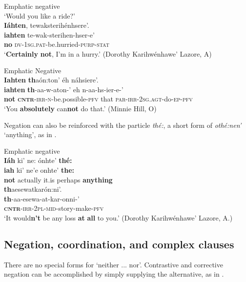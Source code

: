 \documentclass[output=paper,colorlinks,citecolor=brown]{langscibook}
\begin{document}
\ea\label{ex:moh:96}Emphatic negative\\ \medskip ‘Would you like a ride?’\\ \medskip
    \glll \textbf{Iáhten}, tewaksterihénhsere’. \\
         \textbf{iahten} te-wak-sterihen-hser-e’ \\
         \textbf{no} \textsc{dv-1sg.pat-}be.hurried-\textsc{purp-stat}\\
    \glt ‘\textbf{Certainly} \textbf{not}, I’m in a hurry.’ (Dorothy Karihwénhawe’ Lazore, A)
\z


\ea\label{ex:moh:97}Emphatic Negative\\
    \glll \textbf{Iahten} \textbf{th}aón:ton’ éh náhsiere’. \\
         \textbf{iahten} \textbf{th}-aa-w-aton-’ eh n-aa-hs-ier-e-’\\
         \textbf{not} \textsc{\textbf{cntr}-irr-n-}be.possible-\textsc{pfv} that \textsc{par-irr-2sg.agt}-do-\textsc{ep-pfv}\\
    \glt ‘You \textbf{absolutely} can\textbf{not} do that.’ (Minnie Hill, O)
\z

Negation can also be reinforced with the particle \textit{thé:}, a short form of \textit{othé:nen’} ‘anything’, as in .

\ea\label{ex:moh:98}Emphatic negative\\
    \glll \textbf{Iáh} ki’ ne: ónhte’ \textbf{thé:}  \\
         \textbf{iah} ki’ ne’e onhte’ \textbf{the:}  \\
         \textbf{not} actually {it.is}   perhaps \textbf{anything} \\ 
    \glt
    {\qquad} \glll \textbf{th}aesewatkarón:ni’. \\
         \textbf{th}-aa-esewa-at-kar-onni-’ \\
         \textbf{\textsc{cntr}}\textsc{-irr-2pl-mid}-story-make-\textsc{pfv}\\ 
    \glt ‘It would\textbf{n’t} be any loss \textbf{at} \textbf{all} to you.’ (Dorothy Karihwénhawe’ Lazore, A.) 
\z  

\subsection{Negation, coordination, and complex clauses}

There are no special forms for ‘neither ... nor’. Contrastive and corrective negation can be accomplished by simply supplying the alternative, as in .
\end{document}
